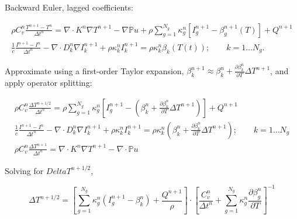 \documentclass{beamer}
\begin{document}
\begin{frame}
    Backward Euler, lagged coefficients:

    \begin{gather}
    \rho C_v^n \frac{T^{n+1} - T^n}{\Delta t^n} = \nabla \cdot K^n \nabla T^{n+1} - \nabla {\mathbb{P}u} + \rho \sum_{g=1}^{N_g} \kappa_g^n \left[ I_g^{n+1} - \beta_g^{n+1}(T) \right] + Q^{n+1}\\
    \frac{1}{c}\frac{I^{n+1} - I^n}{\Delta t^n} - \nabla \cdot D_k^n \nabla I_k^{n+1} + \rho \kappa_k^n I_k^{n+1} = \rho \kappa_k^n \beta_k(T(t)); \qquad k=1\dots N_g.
\end{gather}

Approximate using a first-order Taylor expansion, $\beta_k^{n+1} \approx \beta_k^n + \frac{\partial \beta_k^n}{\partial T}\Delta T^{n+1}$, and apply operator splitting:

\begin{gather}
    \label{eq:MEB}\rho C_v^n \frac{\Delta T^{n+1/2}}{\Delta t^n} =  \rho \sum_{g=1}^{N_g} \kappa_g^n \left[ I_g^{n+1} - \left( \beta_k^n + \frac{\partial \beta_k^n}{\partial T}\Delta T^{n+1}\right) \right] + Q^{n+1}\\
    \label{eq:intermediate_intensity}\frac{1}{c}\frac{I^{n+1} - I^n}{\Delta t^n} - \nabla \cdot D_k^n \nabla I_k^{n+1} + \rho \kappa_k^n I_k^{n+1} = \rho \kappa_k^n \left( \beta_k^n + \frac{\partial \beta_k^n}{\partial T}\Delta T^{n+1}\right); \qquad k=1\dots N_g\\
    \rho C_v^n \frac{\Delta T^{n+1}}{\Delta t^n} = \nabla \cdot K^n \nabla T^{n+1} - \nabla \cdot {\mathbb{P}u}
  \end{gather}

Solving for $Delta T^{n+1/2}$,

\begin{equation}
  \label{eq:intermediate_temperature}\Delta T^{n+1/2} = \left[    \sum_{g=1}^{N_g} \kappa_g^n \left( I_g^{n+1} -  \beta_k^n  \right) +  \frac{Q^{n+1}}{\rho}    \right] \cdot {\left[  \frac{ C_v^n}{\Delta t^n}  + \sum_{g=1}^{N_g}\kappa_g^n \frac{\partial \beta_g^n}{\partial T}\right]}^{-1}
\end{equation}
\end{frame}
\end{document}
